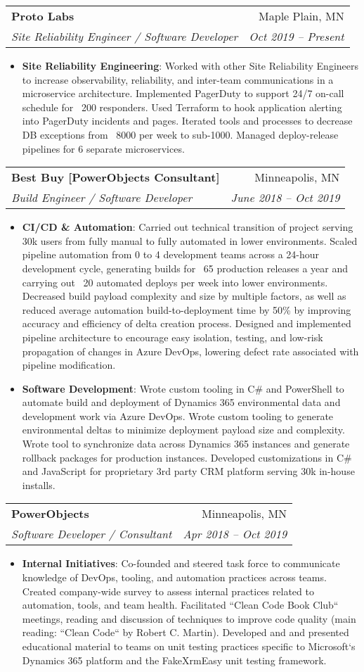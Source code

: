 \documentclass[letterpaper,11pt]{article}
\makeatletter
\newcommand{\resumeItem}[2]{
    \item\small{
      \textbf{#1}{: #2 \vspace{-2pt}}
    }
  }
\newcommand{\resumeSubheading}[4]{
    \vspace{-1pt}\item
      \begin{tabular*}{0.97\textwidth}{l@{\extracolsep{\fill}}r}
        \textbf{#1} & #2 \\
        \textit{\small#3} & \textit{\small #4} \\
      \end{tabular*}\vspace{-5pt}
  }
\newcommand{\resumeItemListStart}{\begin{itemize}}
\newcommand{\resumeItemListEnd}{\end{itemize}\vspace{-5pt}}
\makeatother
\begin{document}
    \resumeSubheading
    {Proto Labs}{Maple Plain, MN}
    {Site Reliability Engineer / Software Developer}{Oct 2019 -- Present}
        \resumeItemListStart
            \resumeItem {Site Reliability Engineering}{Worked with other Site Reliability Engineers to increase observability, reliability, and inter-team communications in a microservice architecture. Implemented PagerDuty to support 24/7 on-call schedule for ~200 responders. Used Terraform to hook application alerting into PagerDuty incidents and pages. Iterated tools and processes to decrease DB exceptions from ~8000 per week to sub-1000. Managed deploy-release pipelines for 6 separate microservices.}
        \resumeItemListEnd
    \resumeSubheading
    {Best Buy [PowerObjects Consultant]}{Minneapolis, MN}
    {Build Engineer / Software Developer}{June 2018 -- Oct 2019}
    \resumeItemListStart
        \resumeItem {CI/CD \& Automation}{Carried out technical transition of project serving 30k users from fully manual to fully automated in lower environments. Scaled pipeline automation from 0 to 4 development teams across a 24-hour development cycle, generating builds for ~65 production releases a year and carrying out ~20 automated deploys per week into lower environments. Decreased build payload complexity and size by multiple factors, as well as reduced average automation build-to-deployment time by 50\% by improving accuracy and efficiency of delta creation process. Designed and implemented pipeline architecture to encourage easy isolation, testing, and low-risk propagation of changes in Azure DevOps, lowering defect rate associated with pipeline modification.}
        \resumeItem {Software Development}{Wrote custom tooling in C\# and PowerShell to automate build and deployment of Dynamics 365 environmental data and development work via Azure DevOps. Wrote custom tooling to generate environmental deltas to minimize deployment payload size and complexity. Wrote tool to synchronize data across Dynamics 365 instances and generate rollback packages for production instances. Developed customizations in C\# and JavaScript for proprietary 3rd party CRM platform serving 30k in-house installs.}
        \resumeItemListEnd
        
    \resumeSubheading
    {PowerObjects}{Minneapolis, MN}
    {Software Developer / Consultant}{Apr 2018 -- Oct 2019}
        \resumeItemListStart
            \resumeItem {Internal Initiatives}{Co-founded and steered task force to communicate knowledge of DevOps, tooling, and automation practices across teams. Created company-wide survey to assess internal practices related to automation, tools, and team health. Facilitated  ``Clean Code Book Club`` meetings, reading and discussion of techniques to improve code quality (main reading: ``Clean Code`` by Robert C. Martin). Developed and and presented educational material to teams on unit testing practices specific to Microsoft`s Dynamics 365 platform and the FakeXrmEasy unit testing framework.}
        \resumeItemListEnd
  
\end{document}
